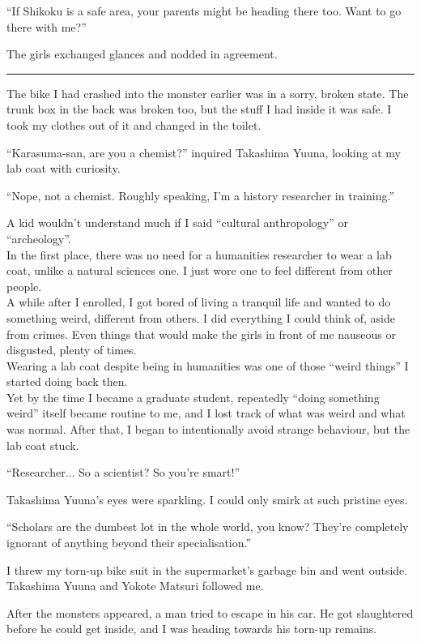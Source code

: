 ``If Shikoku is a safe area, your parents might be heading there too. Want to go there with me?''

The girls exchanged glances and nodded in agreement.

\vspace{\baselineskip}
\hrule
\vspace{\baselineskip}

The bike I had crashed into the monster earlier was in a sorry, broken state. The trunk box in the back was broken too, but the stuff I had inside it was safe. I took my clothes out of it and changed in the toilet.

``Karasuma-san, are you a chemist?'' inquired Takashima Yuuna, looking at my lab coat with curiosity.

``Nope, not a chemist. Roughly speaking, I'm a history researcher in training.''

A kid wouldn't understand much if I said ``cultural anthropology'' or ``archeology''. \\
In the first place, there was no need for a humanities researcher to wear a lab coat, unlike a natural sciences one. I just wore one to feel different from other people. \\
A while after I enrolled, I got bored of living a tranquil life and wanted to do something weird, different from others. I did everything I could think of, aside from crimes. Even things that would make the girls in front of me nauseous or disgusted, plenty of times. \\
Wearing a lab coat despite being in humanities was one of those ``weird things'' I started doing back then. \\
Yet by the time I became a graduate student, repeatedly ``doing something weird'' itself became routine to me, and I lost track of what was weird and what was normal. After that, I began to intentionally avoid strange behaviour, but the lab coat stuck.

``Researcher... So a scientist? So you're smart!''

Takashima Yuuna's eyes were sparkling. I could only smirk at such pristine eyes.

``Scholars are the dumbest lot in the whole world, you know? They're completely ignorant of anything beyond their specialisation.''

I threw my torn-up bike suit in the supermarket's garbage bin and went outside. Takashima Yuuna and Yokote Matsuri followed me.

After the monsters appeared, a man tried to escape in his car. He got slaughtered before he could get inside, and I was heading towards his torn-up remains.


